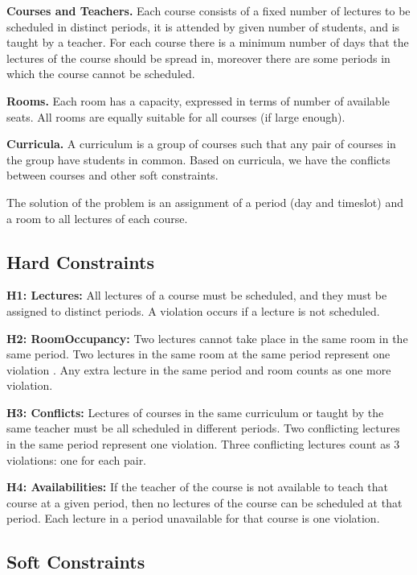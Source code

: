 \documentclass[]{article}
\begin{document}
\textbf{Courses and Teachers.} Each course consists of a fixed number of lectures to be scheduled
in distinct periods, it is attended by given number of students, and is taught by a
teacher. For each course there is a minimum number of days that the lectures of the
course should be spread in, moreover there are some periods in which the course cannot
be scheduled.

\textbf{Rooms.} Each room has a capacity, expressed in terms of number of available seats. All
rooms are equally suitable for all courses (if large enough).

\textbf{Curricula.} A curriculum is a group of courses such that any pair of courses in the group
have students in common. Based on curricula, we have the conflicts between courses
and other soft constraints.

The solution of the problem is an assignment of a period (day and timeslot) and a room
to all lectures of each course.

\subsection{Hard Constraints}

\textbf{H1: Lectures:} All lectures of a course must be scheduled, and they must be assigned to distinct
periods. A violation occurs if a lecture is not scheduled.

\textbf{H2: RoomOccupancy:} Two lectures cannot take place in the same room in the same period.
Two lectures in the same room at the same period represent one violation . Any extra
lecture in the same period and room counts as one more violation.

\textbf{H3: Conflicts:} Lectures of courses in the same curriculum or taught by the same teacher must be
all scheduled in different periods. Two conflicting lectures in the same period represent
one violation. Three conflicting lectures count as 3 violations: one for each pair.

\textbf{H4: Availabilities:} If the teacher of the course is not available to teach that course at a given
period, then no lectures of the course can be scheduled at that period. Each lecture in
a period unavailable for that course is one violation.

\subsection{Soft Constraints}
\end{document}
